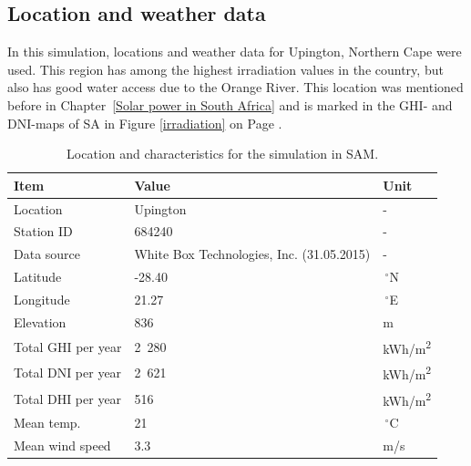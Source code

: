 \subsection{Location and weather data} \label{Location and weather data}
In this simulation, locations and weather data for Upington, Northern Cape were used. This region has among the highest irradiation values in the country, but also has good water access due to the Orange River. This location was mentioned before in Chapter~\ref{Solar power in South Africa} and is marked in the GHI- and DNI-maps of SA in Figure \ref{irradiation} on Page \pageref{irradiation}. 
 
\begin{table}[!h]  
  \centering
	\begin{tabular}{  p{4.0cm}  C{4.0cm}  C{3.0cm} } 

	\hline	
\textbf{Item}  & \textbf{Value} & \textbf{Unit} \\ \hline \hline
Location & Upington & -\\ 
Station ID &  684240& -  \\ 
Data source & White Box Technologies, Inc. (31.05.2015) & -\\ \hline
Latitude & -28.40 &$\,^{\circ}$N \\ 
Longitude &  21.27 &$\,^{\circ}$E \\ 
Elevation &  836 & m \\ 
Total GHI per year  &  2~280 & kWh/m\textsuperscript{2}\\ 
Total DNI per year &  2~621 & kWh/m\textsuperscript{2}\\ 
Total DHI per year &  516 & kWh/m\textsuperscript{2}\\ 
Mean temp. &  21 & $\,^{\circ}\mathrm{C}$\\ 
Mean wind speed & 3.3 & m/s\\ \hline
\end{tabular}
\caption[Location and characteristics for the simulation in SAM.]{Location and characteristics for the simulation in SAM.}\label{tbl: Location}
\end{table}


